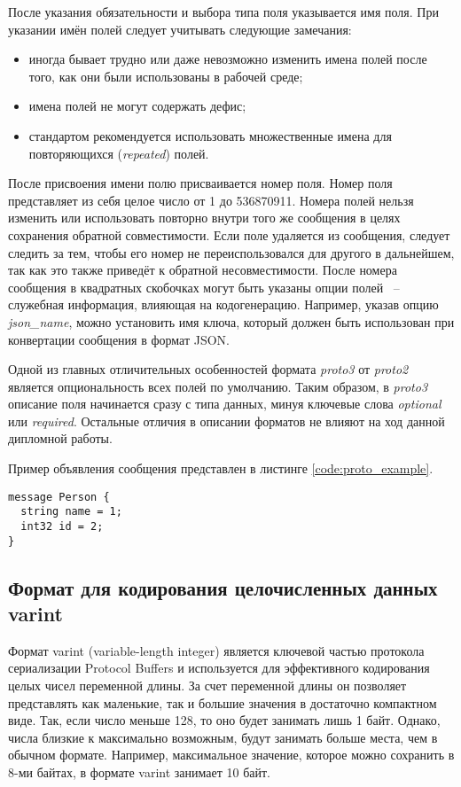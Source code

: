 После указания обязательности и выбора типа поля указывается имя поля. При указании имён полей следует учитывать следующие замечания:
\begin{itemize}
    \item иногда бывает трудно или даже невозможно изменить имена полей после того, как они были использованы в рабочей среде;
    \item имена полей не могут содержать дефис;
    \item стандартом рекомендуется использовать множественные имена для повторяющихся (\textit{repeated}) полей.
\end{itemize}

После присвоения имени полю присваивается номер поля. Номер поля представляет из себя целое число от 1 до 536870911.
Номера полей нельзя изменить или использовать повторно внутри того же сообщения в целях сохранения обратной совместимости.
Если поле удаляется из сообщения, следует следить за тем, чтобы его номер не переиспользовался для другого в дальнейшем, так как это также приведёт к обратной несовместимости.
После номера сообщения в квадратных скобочках могут быть указаны опции полей ~--~ служебная информация, влияющая на кодогенерацию. Например, указав опцию \textit{json\_name}, можно установить имя ключа, который должен быть использован при конвертации сообщения в формат JSON.

Одной из главных отличительных особенностей формата \textit{proto3} от \textit{proto2} является опциональность всех полей по умолчанию.
Таким образом, в \textit{proto3} описание поля начинается сразу с типа данных, минуя ключевые слова \textit{optional} или \textit{required}.
Остальные отличия в описании форматов не влияют на ход данной дипломной работы.

Пример объявления сообщения представлен в листинге \ref{code:proto_example}.

\begin{lstlisting}[style=CodeListing, label=code:proto_example, caption={Пример простейшего protobuf-сообщения}]
message Person {
  string name = 1;
  int32 id = 2;
}
\end{lstlisting}
\vspace{-1em}
\subsection{Формат для кодирования целочисленных данных varint}
Формат varint (variable-length integer) является ключевой частью протокола сериализации Protocol Buffers 
и используется для эффективного кодирования целых чисел переменной длины\cite{protobuf_encoding}. За счет переменной длины он позволяет 
представлять как маленькие, так и большие значения в достаточно компактном виде.
Так, если число меньше 128, то оно будет занимать лишь 1 байт. Однако, числа близкие к максимально возможным, 
будут занимать больше места, чем в обычном формате.
Например, максимальное значение, которое можно сохранить в 8-ми байтах, в формате varint занимает 10 байт.

